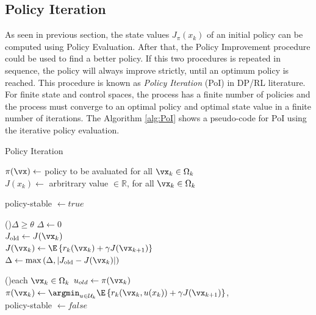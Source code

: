 \subsection{Policy Iteration}
\label{sec:PoIDP}
As seen in previous section, the state values $J_\pi(x_k)$ of an initial policy can be computed using Policy Evaluation. After that, the Policy Improvement procedure could be used to find a better policy. If this two procedures is repeated in sequence, the policy will always improve strictly, until an optimum policy is reached. This procedure is known as \textit{Policy Iteration} (PoI) in DP/RL literature. For finite state and control spaces, the process has a finite number of policies and the process must converge to an optimal policy and optimal state value in a finite number of iterations. 
The Algorithm \ref{alg:PoI} shows a pseudo-code for PoI using the iterative policy evaluation. 

\begin{algorithm}[H]
\DontPrintSemicolon
\caption{Policy Iteration}\label{alg:PoI} %

  $\pi(\vx) \gets$ policy to be avaluated for all $\vx_k \in \Omega_k$ \\
  $J(x_k) \gets $ arbritrary value $\in \mathbb{R}$, for all $\vx_k \in \Omega_k$ 

  {
    policy-stable $\gets true$

    \While(){$\Delta \ge  \theta$} 
    {
      $\Delta \gets 0$ \\
      {
        $J_{\text{old}} \gets J(\vx_k)$ \\
        $J(\vx_k) \gets \E \left\{ r_k(\vx_k) + \gamma J(\vx_{k+1}) \right\}$ \\
        $\Delta \gets \max \left(  \Delta,\left| J_{\text{old}} - J(\vx_k) \right| \right)$
      }
    }  

    \For(){each $\vx_k \in \Omega_k$} 
    {
      $u_{old} \gets \pi(\vx_k)$ \\
      $\pi(\vx_k) \gets \argmin_{u \in \mathcal{U}_k}\E \left\{ r_k(\vx_k,u(x_k)) + \gamma J(\vx_{k+1}) \right\}$, \\
      {
        policy-stable $\gets false$ 
      }
    } 
  }
\end{algorithm}

